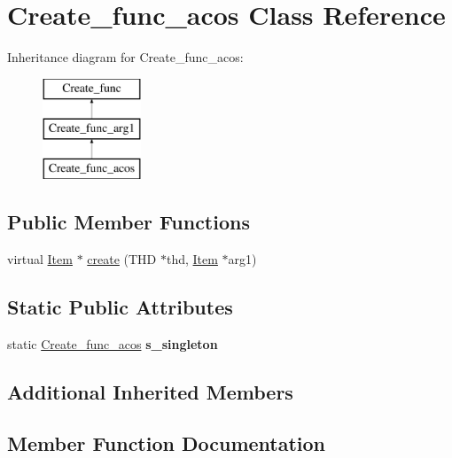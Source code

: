 \hypertarget{classCreate__func__acos}{}\section{Create\+\_\+func\+\_\+acos Class Reference}
\label{classCreate__func__acos}
Inheritance diagram for Create\+\_\+func\+\_\+acos\+:\begin{figure}[H]
\begin{center}
\leavevmode
\includegraphics[height=3.000000cm]{classCreate__func__acos}
\end{center}
\end{figure}
\subsection*{Public Member Functions}
\begin{DoxyCompactItemize}
\item 
virtual \mbox{\hyperlink{classItem}{Item}} $\ast$ \mbox{\hyperlink{classCreate__func__acos_aeecea13014e200c48927ca613819b573}{create}} (T\+HD $\ast$thd, \mbox{\hyperlink{classItem}{Item}} $\ast$arg1)
\end{DoxyCompactItemize}
\subsection*{Static Public Attributes}
\begin{DoxyCompactItemize}
\item 
\mbox{\label{classCreate__func__acos_abf73af0ffe2b1fb78ea729b9f2bfde5e}} 
static \mbox{\hyperlink{classCreate__func__acos}{Create\+\_\+func\+\_\+acos}} {\bfseries s\+\_\+singleton}
\end{DoxyCompactItemize}
\subsection*{Additional Inherited Members}


\subsection{Member Function Documentation}
\mbox{\label{classCreate__func__acos_aeecea13014e200c48927ca613819b573}} 
